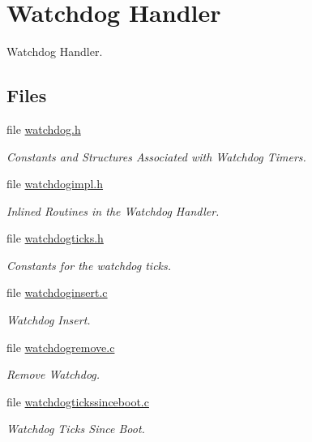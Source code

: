 \hypertarget{group__RTEMSScoreWatchdog}{}\section{Watchdog Handler}
\label{group__RTEMSScoreWatchdog}


Watchdog Handler.  


\subsection*{Files}
\begin{DoxyCompactItemize}
\item 
file \mbox{\hyperlink{cpukit_2include_2rtems_2score_2watchdog_8h}{watchdog.\+h}}
\begin{DoxyCompactList}\small\item\em Constants and Structures Associated with Watchdog Timers. \end{DoxyCompactList}\item 
file \mbox{\hyperlink{watchdogimpl_8h}{watchdogimpl.\+h}}
\begin{DoxyCompactList}\small\item\em Inlined Routines in the Watchdog Handler. \end{DoxyCompactList}\item 
file \mbox{\hyperlink{watchdogticks_8h}{watchdogticks.\+h}}
\begin{DoxyCompactList}\small\item\em Constants for the watchdog ticks. \end{DoxyCompactList}\item 
file \mbox{\hyperlink{watchdoginsert_8c}{watchdoginsert.\+c}}
\begin{DoxyCompactList}\small\item\em Watchdog Insert. \end{DoxyCompactList}\item 
file \mbox{\hyperlink{watchdogremove_8c}{watchdogremove.\+c}}
\begin{DoxyCompactList}\small\item\em Remove Watchdog. \end{DoxyCompactList}\item 
file \mbox{\hyperlink{watchdogtickssinceboot_8c}{watchdogtickssinceboot.\+c}}
\begin{DoxyCompactList}\small\item\em Watchdog Ticks Since Boot. \end{DoxyCompactList}\end{DoxyCompactItemize}

